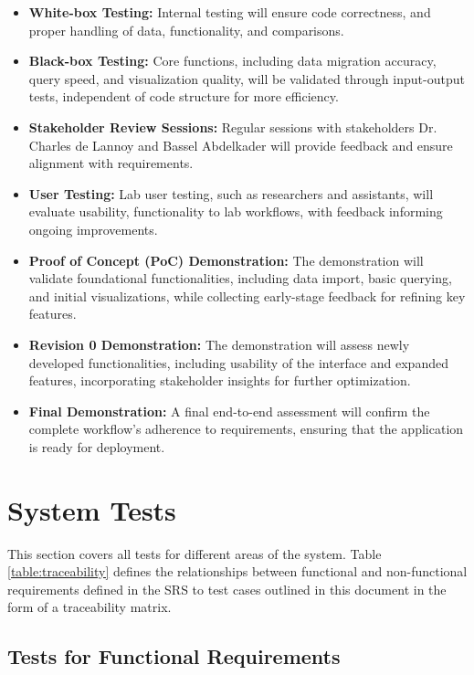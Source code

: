 \documentclass[12pt, titlepage]{article}
\begin{document}
\begin{itemize}
    \item \textbf{White-box Testing:} Internal testing will ensure code
    correctness, and proper handling of data, functionality, and comparisons.
    \item \textbf{Black-box Testing:} Core functions, including data migration
    accuracy, query speed, and visualization quality, will be validated through
    input-output tests, independent of code structure for more efficiency.
    \item \textbf{Stakeholder Review Sessions:} Regular sessions with
    stakeholders Dr. Charles de Lannoy and Bassel Abdelkader will provide
    feedback and ensure alignment with requirements.
    \item \textbf{User Testing:} Lab user testing, such as researchers and
    assistants, will evaluate usability, functionality to lab workflows, with
    feedback informing ongoing improvements.
    \item \textbf{Proof of Concept (PoC) Demonstration:} The demonstration will
    validate foundational functionalities, including data import, basic
    querying, and initial visualizations, while collecting early-stage feedback
    for refining key features.
    \item \textbf{Revision 0 Demonstration:} The demonstration will assess newly
    developed functionalities, including usability of the interface and expanded
    features, incorporating stakeholder insights for further optimization.
    \item \textbf{Final Demonstration:} A final end-to-end assessment will
    confirm the complete workflow’s adherence to requirements, ensuring that the
    application is ready for deployment.
\end{itemize}

\section{System Tests}
This section covers all tests for different areas of the system. Table
\ref{table:traceability} defines the relationships between functional and
non-functional requirements defined in the SRS to test cases outlined in this
document in the form of a traceability matrix.

\subsection{Tests for Functional Requirements}
\end{document}
